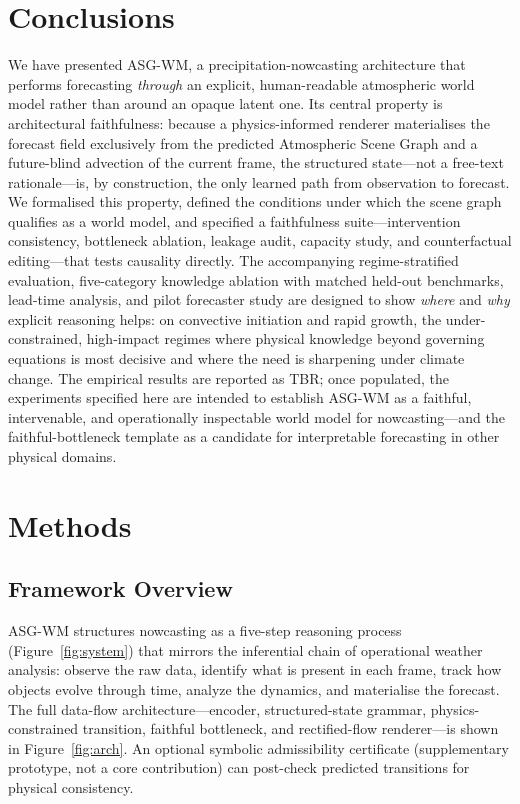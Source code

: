 \documentclass[fleqn,10pt]{wlscirep}
\begin{document}
\section*{Conclusions}

We have presented ASG-WM, a precipitation-nowcasting architecture that performs forecasting \emph{through} an explicit, human-readable atmospheric world model rather than around an opaque latent one.
Its central property is architectural faithfulness: because a physics-informed renderer materialises the forecast field exclusively from the predicted Atmospheric Scene Graph and a future-blind advection of the current frame, the structured state---not a free-text rationale---is, by construction, the only learned path from observation to forecast.
We formalised this property, defined the conditions under which the scene graph qualifies as a world model, and specified a faithfulness suite---intervention consistency, bottleneck ablation, leakage audit, capacity study, and counterfactual editing---that tests causality directly.
The accompanying regime-stratified evaluation, five-category knowledge ablation with matched held-out benchmarks, lead-time analysis, and pilot forecaster study are designed to show \emph{where} and \emph{why} explicit reasoning helps: on convective initiation and rapid growth, the under-constrained, high-impact regimes where physical knowledge beyond governing equations is most decisive and where the need is sharpening under climate change.
The empirical results are reported as TBR; once populated, the experiments specified here are intended to establish ASG-WM as a faithful, intervenable, and operationally inspectable world model for nowcasting---and the faithful-bottleneck template as a candidate for interpretable forecasting in other physical domains.

\section*{Methods}

\subsection*{Framework Overview}

ASG-WM structures nowcasting as a five-step reasoning process (Figure~\ref{fig:system}) that mirrors the inferential chain of operational weather analysis: observe the raw data, identify what is present in each frame, track how objects evolve through time, analyze the dynamics, and materialise the forecast.
The full data-flow architecture---encoder, structured-state grammar, physics-constrained transition, faithful bottleneck, and rectified-flow renderer---is shown in Figure~\ref{fig:arch}.
An optional symbolic admissibility certificate (supplementary prototype, not a core contribution) can post-check predicted transitions for physical consistency.
\end{document}
